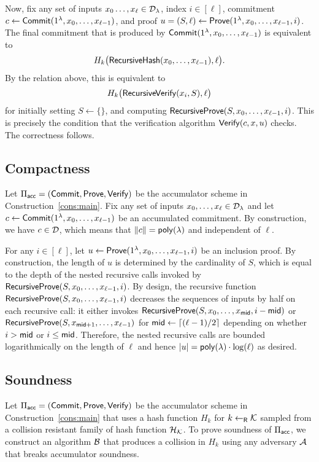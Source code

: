 \noindent
Now, fix any set of inputs $x_0 \ldots, x_\ell \in
\mathcal{D}_\lambda$, index $i \in [\ell]$, commitment $c \gets \mathsf{Commit}(1^\lambda,
x_0, \ldots, x_{\ell-1})$, and proof $u = (S, \ell) \gets \mathsf{Prove}(1^\lambda, x_0,
\ldots, \allowbreak x_{\ell-1}, \allowbreak i)$. The final commitment that is
produced by $\mathsf{Commit}(1^\lambda, x_0, \ldots, x_{\ell-1})$ is equivalent to
\[ H_k \big( \mathsf{RecursiveHash}(x_0, \ldots, x_{\ell-1}), \ell \big) .\]
By the relation above, this is equivalent to
\[ H_k \big( \mathsf{RecursiveVerify}(x_i, S), \ell \big) \]
for initially setting $S \gets \{ \}$, and computing $\mathsf{RecursiveProve}(S, x_0,
\ldots, x_{\ell-1}, i)$. This is precisely the
condition that the verification algorithm $\mathsf{Verify}(c, x, u)$ checks. The
correctness follows.

\subsection{Compactness}

Let $\Pi_{\mathsf{acc}} = (\mathsf{Commit}, \mathsf{Prove}, \mathsf{Verify})$ be the accumulator scheme in
Construction~\ref{cons:main}. Fix any set of inputs $x_0, \ldots, x_\ell \in
\mathcal{D}_\lambda$ and let $c \gets \mathsf{Commit}(1^\lambda, x_0, \ldots, x_{\ell-1})$ be
an accumulated commitment. By construction, we have $c \in \mathcal{D}$, which means
that $\|c\| = \mathsf{poly}(\lambda)$ and independent of $\ell$.

For any $i \in [\ell]$, let $u \gets \mathsf{Prove}(1^\lambda, x_0, \ldots, x_{\ell-1},
i)$ be an inclusion proof. By construction, the length of $u$ is determined by
the cardinality of $S$, which is equal to the depth of the nested recursive
calls invoked by $\mathsf{RecursiveProve}(S, x_0, \ldots, x_{\ell-1}, i)$. By design,
the recursive function $\mathsf{RecursiveProve}(S, x_0, \ldots, x_{\ell-1}, i)$
decreases the sequences of inputs by half on each recursive call: it either
invokes $\mathsf{RecursiveProve}(S, x_0, \ldots, x_{\mathsf{mid}}, i-\mathsf{mid})$ or $\mathsf{RecursiveProve}(S,
x_{\mathsf{mid}+1}, \ldots, x_{\ell-1})$ for $\mathsf{mid} \gets \lceil (\ell-1)/2 \rceil$
depending on whether $i > \mathsf{mid}$ or $i \le \mathsf{mid}$. Therefore, the nested recursive
calls are bounded logarithmically on the length of $\ell$ and hence $|u| =
\mathsf{poly}(\lambda) \cdot \log(\ell)$ as desired.


\subsection{Soundness}

Let $\Pi_{\mathsf{acc}} = (\mathsf{Commit}, \mathsf{Prove}, \mathsf{Verify})$ be the accumulator scheme in
Construction~\ref{cons:main} that uses a hash function $H_k$ for $k \gets_{\mathsf{R}}
\mathcal{K}$ sampled from a collision resistant family of hash function $\mathcal{H}_{\mathcal{K}}$.
To prove soundness of $\Pi_{\mathsf{acc}}$, we construct an algorithm $\mathcal{B}$ that produces
a collision in $H_k$ using any adversary $\mathcal{A}$ that breaks accumulator
soundness.

